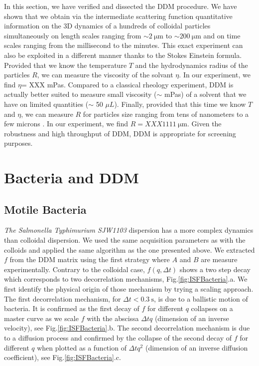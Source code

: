 \documentclass[prb,reprint,amsmath,amssymb]{revtex4-1}
\newcommand{\tg}[1]{{\color{magenta}#1}} %
\begin{document}
In this section, we have verified and dissected the DDM procedure. We have shown that we obtain via the intermediate scattering function quantitative information on the 3D dynamics of a hundreds of colloidal particles simultaneously on length scales ranging from $\sim \SI{2}{\micro\meter}$ to $\sim \SI{200}{\micro\meter}$ and on time scales ranging from the millisecond to the minutes. This exact experiment can also be exploited in a different manner thanks to the Stokes Einstein formula. Provided  that we know the temperature $T$ and the hydrodynamics radius of the particles $R$, we can measure the viscosity of the solvant $\eta$. \tg{In our experiment, we find $\eta$= XXX mPas}. Compared to a classical rheology experiment, DDM is actually better suited to measure small viscosity ($\sim$ mPas) of a solvent that we have on limited quantities ($\sim$ 50 $\mu L$). Finally, provided that this time we know $T$ and $\eta$, we can measure $R$ for particles size ranging from tens of nanometers to a few microns \cite{2_DDM}.  \tg{In our experiment, we find $R= XXX\SI{1111}{\micro\meter}$}. Given the robustness and high throughput of DDM, DDM is appropriate for screening purposes.

\section{Bacteria and DDM}
\label{sec:BactSection}

\subsection{Motile Bacteria}

\tg{\textit{The Salmonella Typhimurium SJW1103} dispersion has a more complex dynamics than colloidal dispersion. We used the same acquisition parameters as with the colloids and applied the same algorithm as the one presented above. We extracted $f$ from the DDM matrix using the first strategy where $A$ and $B$ are measure experimentally.} Contrary to the colloidal case, $f(q, \Delta t)$ shows a two step decay which corresponds to two decorrelation mechanisms, Fig.\ref{fig:ISFBacteria}.a. We first identify the physical origin of those mechanism by trying a scaling approach. The first decorrelation mechanism, for $\Delta t < \SI{0.3}{\second}$, is due to a ballistic motion of bacteria. It is confirmed as the first decay of $f$  for different $q$  collapses on a master curve as we scale $f$ with the abscissa  $\Delta t q$ (dimension of an inverse velocity), see Fig.\ref{fig:ISFBacteria}.b. The second decorrelation mechanism is due to a diffusion process and confirmed by the collapse of the second decay of $f$ for different $q$ when plotted as a function of $\Delta t q^2$ (dimension of an inverse diffusion coefficient), see Fig.\ref{fig:ISFBacteria}.c.
\end{document}
